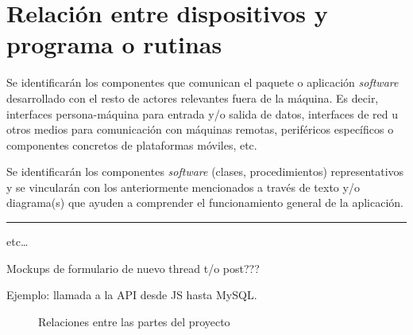 \documentclass[12pt,a4paper,titlepage]{article}
\begin{document}



    \section{Relación entre dispositivos y programa o rutinas}

    Se identificarán los componentes que comunican el paquete o aplicación \textit{software} desarrollado con el resto de actores relevantes fuera de la máquina. Es decir, interfaces persona-máquina para entrada y/o salida de datos, interfaces de red u otros medios para comunicación con máquinas remotas, periféricos específicos o componentes concretos de plataformas móviles, etc.

    Se identificarán los componentes \textit{software} (clases, procedimientos) representativos y se vincularán con los anteriormente mencionados a través de texto y/o diagrama(s) que ayuden a comprender el funcionamiento general de la aplicación.

    \bigskip\hrule\bigskip

    etc\dots

    Mockups de formulario de nuevo thread t/o post???

    Ejemplo: llamada a la API desde JS hasta MySQL.

    

    \begin{figure}[ht]
        \centering
        \caption{Relaciones entre las partes del proyecto}\bigskip
        \label{project:schema}
        \shorthandoff{>}\shorthandoff{<}
        \shorthandon{>}\shorthandon{<}
    \end{figure}
\end{document}

